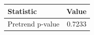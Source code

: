 \begin{tabular}{lr}
\toprule
Statistic & Value \\
\midrule
Pretrend p-value & 0.7233 \\
\bottomrule
\end{tabular}
